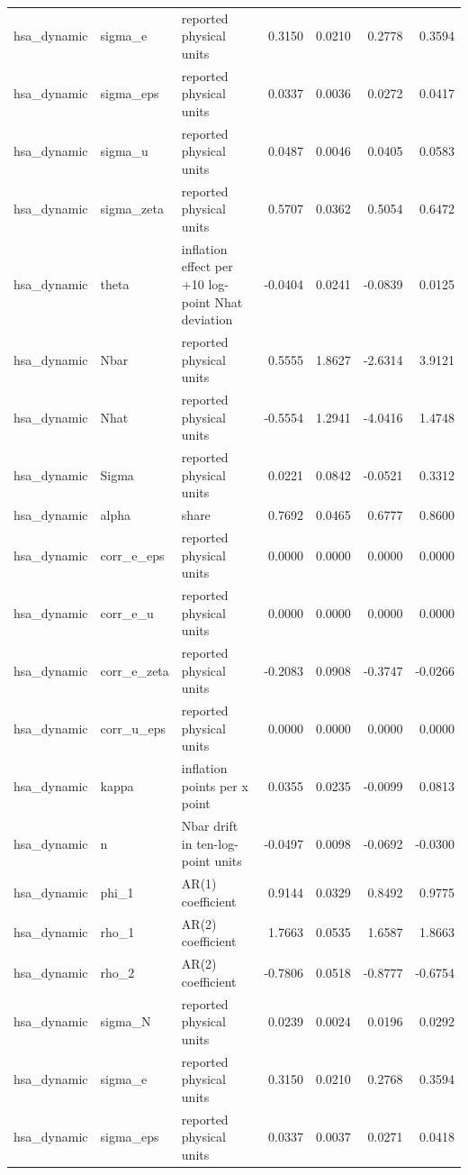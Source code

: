 \begin{tabular}{lllrrrr}
hsa\_dynamic & sigma\_e & reported physical units & 0.3150 & 0.0210 & 0.2778 & 0.3594 \\
hsa\_dynamic & sigma\_eps & reported physical units & 0.0337 & 0.0036 & 0.0272 & 0.0417 \\
hsa\_dynamic & sigma\_u & reported physical units & 0.0487 & 0.0046 & 0.0405 & 0.0583 \\
hsa\_dynamic & sigma\_zeta & reported physical units & 0.5707 & 0.0362 & 0.5054 & 0.6472 \\
hsa\_dynamic & theta & inflation effect per +10 log-point Nhat deviation & -0.0404 & 0.0241 & -0.0839 & 0.0125 \\
hsa\_dynamic & Nbar & reported physical units & 0.5555 & 1.8627 & -2.6314 & 3.9121 \\
hsa\_dynamic & Nhat & reported physical units & -0.5554 & 1.2941 & -4.0416 & 1.4748 \\
hsa\_dynamic & Sigma & reported physical units & 0.0221 & 0.0842 & -0.0521 & 0.3312 \\
hsa\_dynamic & alpha & share & 0.7692 & 0.0465 & 0.6777 & 0.8600 \\
hsa\_dynamic & corr\_e\_eps & reported physical units & 0.0000 & 0.0000 & 0.0000 & 0.0000 \\
hsa\_dynamic & corr\_e\_u & reported physical units & 0.0000 & 0.0000 & 0.0000 & 0.0000 \\
hsa\_dynamic & corr\_e\_zeta & reported physical units & -0.2083 & 0.0908 & -0.3747 & -0.0266 \\
hsa\_dynamic & corr\_u\_eps & reported physical units & 0.0000 & 0.0000 & 0.0000 & 0.0000 \\
hsa\_dynamic & kappa & inflation points per x point & 0.0355 & 0.0235 & -0.0099 & 0.0813 \\
hsa\_dynamic & n & Nbar drift in ten-log-point units & -0.0497 & 0.0098 & -0.0692 & -0.0300 \\
hsa\_dynamic & phi\_1 & AR(1) coefficient & 0.9144 & 0.0329 & 0.8492 & 0.9775 \\
hsa\_dynamic & rho\_1 & AR(2) coefficient & 1.7663 & 0.0535 & 1.6587 & 1.8663 \\
hsa\_dynamic & rho\_2 & AR(2) coefficient & -0.7806 & 0.0518 & -0.8777 & -0.6754 \\
hsa\_dynamic & sigma\_N & reported physical units & 0.0239 & 0.0024 & 0.0196 & 0.0292 \\
hsa\_dynamic & sigma\_e & reported physical units & 0.3150 & 0.0210 & 0.2768 & 0.3594 \\
hsa\_dynamic & sigma\_eps & reported physical units & 0.0337 & 0.0037 & 0.0271 & 0.0418 \\

\end{tabular}
